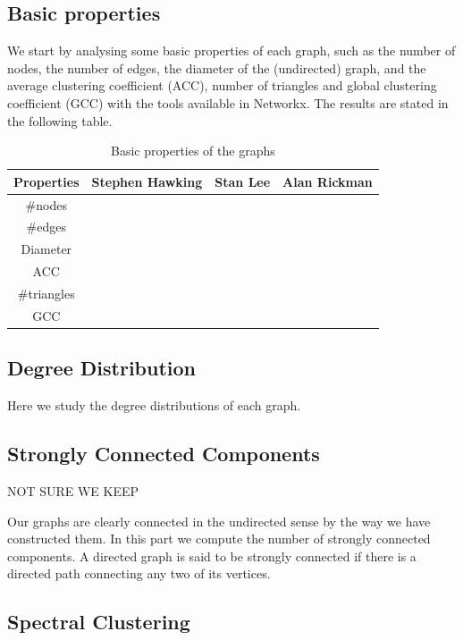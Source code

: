 \documentclass[conference]{IEEEtran}
\begin{document}
\subsection{Basic properties}
We start by analysing some basic properties of each graph, such as the number of nodes, the number of edges, the diameter of the (undirected) graph, and the average clustering coefficient (ACC), number of triangles and global clustering coefficient (GCC) with the tools available in Networkx. The results are stated in the  following table. 


\begin{table}[htbp]
\caption{Basic properties of the graphs}
\begin{center}
\begin{tabular}{|c|c|c|c|}
\hline
 Properties & \textbf{Stephen Hawking}& \textbf{Stan Lee}& \textbf{Alan Rickman} \\
\hline
$\#$nodes& & &  \\
\hline
$\#$edges & & &  \\
\hline
Diameter & & &  \\
\hline
ACC& & &  \\
\hline
$\#$triangles  & & &  \\
GCC & & &  \\
\hline
\end{tabular}
\end{center}
\end{table}

\subsection{Degree Distribution}

Here we study the degree distributions of each graph. 

\subsection{Strongly Connected Components}

NOT SURE WE KEEP

\medskip

Our graphs are clearly connected in the undirected sense by the way we have constructed them. In this part we compute the number of strongly connected components. A directed graph is said to be strongly connected if there is a directed path connecting any two of its vertices. 

\subsection{Spectral Clustering }
\end{document}
